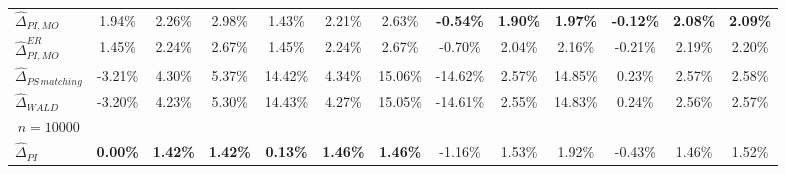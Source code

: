 \documentclass{article}
\begin{document}
\begin{landscape}
\begin{table}[]
{\begin{tabular}{l|lll|lll|lll|lll}
$\widehat{\Delta}_{PI,MO}$        &\multicolumn{1}{c}{ 1.94\% }&\multicolumn{1}{c}{ 2.26\% }&\multicolumn{1}{c|}{ 2.98\% }&\multicolumn{1}{c}{ 1.43\% }&\multicolumn{1}{c}{ 2.21\% }&\multicolumn{1}{c|}{ 2.63\% }&\multicolumn{1}{c}{ \textbf{-0.54\%} }&\multicolumn{1}{c}{ \textbf{1.90\%} }&\multicolumn{1}{c|}{ \textbf{1.97\%} }&\multicolumn{1}{c}{ \textbf{-0.12\%} }&\multicolumn{1}{c}{ \textbf{2.08\%} }&\multicolumn{1}{c}{ \textbf{2.09\%} }\\ 
$\widehat{\Delta}_{PI,MO}^{ER}$   &\multicolumn{1}{c}{ 1.45\% }&\multicolumn{1}{c}{ 2.24\% }&\multicolumn{1}{c|}{ 2.67\% }&\multicolumn{1}{c}{ 1.45\% }&\multicolumn{1}{c}{ 2.24\% }&\multicolumn{1}{c|}{ 2.67\% }&\multicolumn{1}{c}{ -0.70\% }&\multicolumn{1}{c}{ 2.04\% }&\multicolumn{1}{c|}{ 2.16\% }&\multicolumn{1}{c}{ -0.21\% }&\multicolumn{1}{c}{ 2.19\% }&\multicolumn{1}{c}{ 2.20\% }\\ 
$\widehat{\Delta}_{PS\,matching}$ &\multicolumn{1}{c}{ -3.21\% }&\multicolumn{1}{c}{ 4.30\% }&\multicolumn{1}{c|}{ 5.37\% }&\multicolumn{1}{c}{ 14.42\% }&\multicolumn{1}{c}{ 4.34\% }&\multicolumn{1}{c|}{ 15.06\% }&\multicolumn{1}{c}{ -14.62\% }&\multicolumn{1}{c}{ 2.57\% }&\multicolumn{1}{c|}{ 14.85\% }&\multicolumn{1}{c}{ 0.23\% }&\multicolumn{1}{c}{ 2.57\% }&\multicolumn{1}{c}{ 2.58\% }\\ 
$\widehat{\Delta}_{WALD}$         &\multicolumn{1}{c}{ -3.20\% }&\multicolumn{1}{c}{ 4.23\% }&\multicolumn{1}{c|}{ 5.30\% }&\multicolumn{1}{c}{ 14.43\% }&\multicolumn{1}{c}{ 4.27\% }&\multicolumn{1}{c|}{ 15.05\% }&\multicolumn{1}{c}{ -14.61\% }&\multicolumn{1}{c}{ 2.55\% }&\multicolumn{1}{c|}{ 14.83\% }&\multicolumn{1}{c}{ 0.24\% }&\multicolumn{1}{c}{ 2.56\% }&\multicolumn{1}{c}{ 2.57\% }\\ 
\multicolumn{1}{c|}{$n= 10000 $}          &                                             &                                                                 &                                        &                                             &                                                                 &                                        &                                             &                                                                 &                                        &                                             &                                                                 &                                       \\ 
$\widehat{\Delta}_{PI}$           &\multicolumn{1}{c}{ \textbf{0.00\%} }&\multicolumn{1}{c}{ \textbf{1.42\%} }&\multicolumn{1}{c|}{ \textbf{1.42\%} }&\multicolumn{1}{c}{ \textbf{0.13\%} }&\multicolumn{1}{c}{ \textbf{1.46\%} }&\multicolumn{1}{c|}{ \textbf{1.46\%} }&\multicolumn{1}{c}{ -1.16\% }&\multicolumn{1}{c}{ 1.53\% }&\multicolumn{1}{c|}{ 1.92\% }&\multicolumn{1}{c}{ -0.43\% }&\multicolumn{1}{c}{ 1.46\% }&\multicolumn{1}{c}{ 1.52\% }\\ 

\end{tabular}}
\end{table}
\end{landscape}
\end{document}
